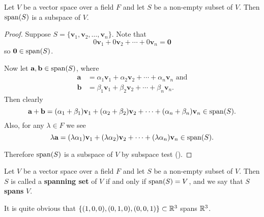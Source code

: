 \begin{proposition}
    Let $V$ be a vector space over a field $F$ and let $S$ be a non-empty subset of $V$. Then $\mathrm{span}(S)$ is a subspace of $V$.
\end{proposition}
\begin{proof}
    Suppose $S = \{\textbf{v}_1, \textbf{v}_2, \dots, \textbf{v}_n\}$. Note that
    \[
        0\textbf{v}_1 + 0\textbf{v}_2 + \cdots + 0\textbf{v}_n = \textbf{0}
    \]
    so $\textbf{0} \in \mathrm{span}(S)$.

    Now let $\textbf{a}, \textbf{b} \in \mathrm{span}(S)$, where
    \begin{align*}
        \textbf{a} &= \alpha_1\textbf{v}_1 + \alpha_2\textbf{v}_2 + \cdots + \alpha_n\textbf{v}_n \text{ and}\\
        \textbf{b} &= \beta_1\textbf{v}_1 + \beta_2\textbf{v}_2 + \cdots + \beta_n\textbf{v}_n.
    \end{align*}
    Then clearly
    \[
        \textbf{a} + \textbf{b} = (\alpha_1+\beta_1)\textbf{v}_1 + (\alpha_2+\beta_2)\textbf{v}_2 + \cdots + (\alpha_n+\beta_n)\textbf{v}_n \in \mathrm{span}(S).
    \]
    Also, for any $\lambda \in F$ we see
    \[
        \lambda\textbf{a} = (\lambda\alpha_1)\textbf{v}_1 + (\lambda\alpha_2)\textbf{v}_2 + \cdots + (\lambda\alpha_n)\textbf{v}_n \in \mathrm{span}(S).
    \]

    Therefore $\mathrm{span}(S)$ is a subspace of $V$ by subspace test ().
\end{proof}

\begin{definition}
    Let $V$ be a vector space over a field $F$ and let $S$ be a non-empty subset of $V$. Then $S$ is called a \textbf{spanning set} of $V$ if and only if $\mathrm{span}(S) = V$, and we say that $S$ \textbf{spans} $V$.
\end{definition}

\begin{example}
    It is quite obvious that $\{(1, 0, 0), (0, 1, 0), (0, 0, 1)\} \subset \mathbb{R}^3$ spans $\mathbb{R}^3$.
\end{example}

